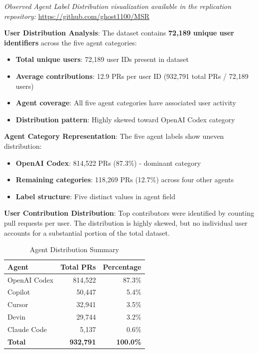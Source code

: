 \documentclass[conference]{IEEEtran}
\begin{document}
\noindent\textit{Observed Agent Label Distribution visualization available in the replication repository:} \url{https://github.com/ghost1100/MSR}

\textbf{User Distribution Analysis}: The dataset contains \textbf{72,189 unique user identifiers} across the five agent categories:
\begin{itemize}
    \item \textbf{Total unique users}: 72,189 user IDs present in dataset
    \item \textbf{Average contributions}: 12.9 PRs per user ID (932,791 total PRs / 72,189 users)
    \item \textbf{Agent coverage}: All five agent categories have associated user activity
    \item \textbf{Distribution pattern}: Highly skewed toward OpenAI Codex category
\end{itemize}

\textbf{Agent Category Representation}: The five agent labels show uneven distribution:
\begin{itemize}
    \item \textbf{OpenAI Codex}: 814,522 PRs (87.3\%) - dominant category
    \item \textbf{Remaining categories}: 118,269 PRs (12.7\%) across four other agents
    \item \textbf{Label structure}: Five distinct values in agent field
\end{itemize}

\textbf{User Contribution Distribution}: Top contributors were identified by counting pull requests per user. The distribution is highly skewed, but no individual user accounts for a substantial portion of the total dataset.

\begin{table}[t]
\centering
\caption{Agent Distribution Summary}
\label{tab:agent_distribution}
\begin{tabular}{@{}lrr@{}}
\toprule
\textbf{Agent} & \textbf{Total PRs} & \textbf{Percentage} \\
\midrule
OpenAI Codex & 814,522 & 87.3\% \\
Copilot & 50,447 & 5.4\% \\
Cursor & 32,941 & 3.5\% \\
Devin & 29,744 & 3.2\% \\
Claude Code & 5,137 & 0.6\% \\
\midrule
\textbf{Total} & \textbf{932,791} & \textbf{100.0\%} \\
\bottomrule
\end{tabular}
\end{table}
\end{document}
